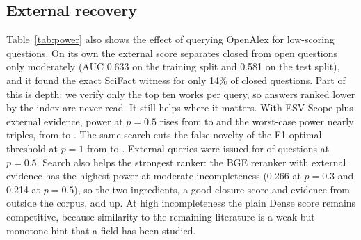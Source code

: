 \documentclass[conference,a4paper]{IEEEtran}
\theoremstyle{definition}
\begin{document}
\subsection{External recovery}
Table~\ref{tab:power} also shows the effect of querying OpenAlex for low-scoring questions. On its own the external score separates closed from open questions only moderately (AUC 0.633 on the training split and 0.581 on the test split), and it found the exact SciFact witness for only 14\% of closed questions. Part of this is depth: we verify only the top ten works per query, so answers ranked lower by the index are never read. It still helps where it matters. With ESV-Scope plus external evidence, power at $p=0.5$ rises from \PowESVHalf{} to \PowOAHalf{} and the worst-case power nearly triples, from \PowESVWorst{} to \PowOAWorst{}. The same search cuts the false novelty of the F1-optimal threshold at $p=1$ from \FNfoneOne{} to \FNfoneOAOne{}. External queries were issued for \ExtCalls{} of questions at $p=0.5$. Search also helps the strongest ranker: the BGE reranker with external evidence has the highest power at moderate incompleteness (0.266 at $p=0.3$ and 0.214 at $p=0.5$), so the two ingredients, a good closure score and evidence from outside the corpus, add up. At high incompleteness the plain Dense score remains competitive, because similarity to the remaining literature is a weak but monotone hint that a field has been studied.

\begin{table}[t]
\centering
\caption{Power (share of truly open questions certified) at false novelty $\le 0.10$. ``+OA'': with targeted OpenAlex evidence. Worst case uses $\hat p=1$.}
\label{tab:power}

\end{table}
\end{document}
